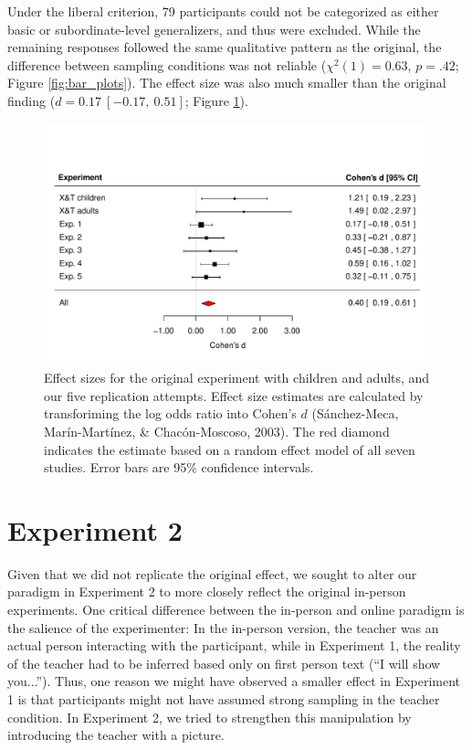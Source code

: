 \documentclass[man]{apa2}
\begin{document}
Under the liberal criterion, 79 participants could not be categorized as either basic or subordinate-level generalizers, and thus were excluded. While the remaining responses followed the same qualitative pattern as the original, the difference between sampling conditions was not reliable ($\chi^2(1) = 0.63$, $p = .42$; Figure \ref{fig:bar_plots}). The effect size was also much smaller than the original finding ($d = 0.17\ [-0.17,\ 0.51]$; Figure \ref{fig:effect_sizes}).

\begin{figure} [t]
  \centering
  \includegraphics[width=6in]{figures/FIG_3.pdf} 
  \caption{\label{fig:effect_sizes} Effect sizes for the original experiment with children and adults, and our five replication attempts. Effect size estimates are calculated  by transforiming the log odds ratio into Cohen's $d$ (S\'{a}nchez-Meca, Mar\'{i}n-Mart\'{i}nez, \& Chac\'{o}n-Moscoso, 2003). The red diamond indicates the estimate based on a random effect model of all seven studies. Error bars are 95\% confidence intervals.} 
\end{figure}


\section{Experiment 2}

Given that we did not replicate the original effect, we sought to alter our paradigm in Experiment 2 to more closely reflect the original in-person experiments. One critical difference between the in-person and online paradigm is the salience of the experimenter: In the in-person version, the teacher was an actual person interacting with the participant, while in Experiment 1, the reality of the teacher had to be inferred based only on first person text (``I will show you...''). Thus, one reason we might have observed a smaller effect in Experiment 1 is that participants might not have assumed strong sampling in the teacher condition. In Experiment 2, we tried to strengthen this manipulation by introducing the teacher with a picture.
\end{document}
